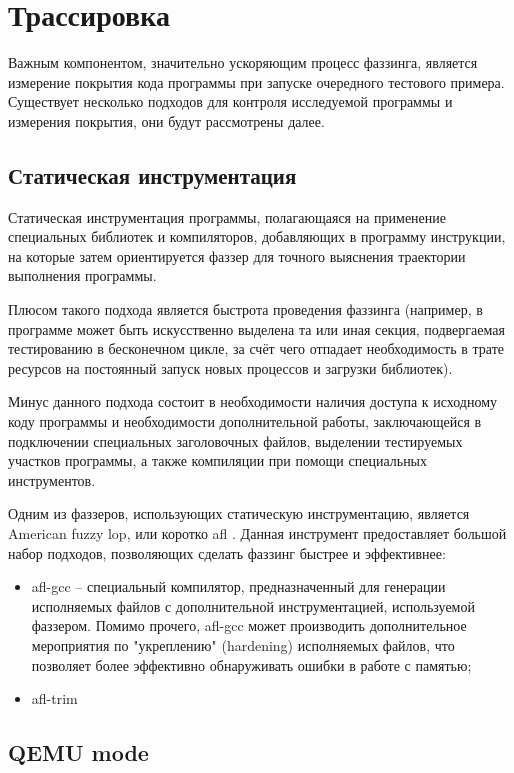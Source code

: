 \section{Трассировка}\label{sec:trace}

Важным компонентом, значительно ускоряющим процесс фаззинга, является измерение покрытия кода программы при запуске очередного тестового примера. Существует несколько подходов для контроля исследуемой программы и измерения покрытия, они будут рассмотрены далее.


\subsection{Статическая инструментация}

Статическая инструментация программы, полагающаяся на применение специальных библиотек и компиляторов, добавляющих в программу инструкции, на которые затем ориентируется фаззер для точного выяснения траектории выполнения программы.

Плюсом такого подхода является быстрота проведения фаззинга (например, в программе может быть искусственно выделена та или иная секция, подвергаемая тестированию в бесконечном цикле, за счёт чего отпадает необходимость в трате ресурсов на постоянный запуск новых процессов и загрузки библиотек).

Минус данного подхода состоит в необходимости наличия доступа к исходному коду программы и необходимости дополнительной работы, заключающейся в подключении специальных заголовочных файлов, выделении тестируемых участков программы, а также компиляции при помощи специальных инструментов.

Одним из фаззеров, использующих статическую инструментацию, является American fuzzy lop, или коротко afl \cite{afl}. Данная инструмент предоставляет большой набор подходов, позволяющих сделать фаззинг быстрее и эффективнее:

\begin{itemize}
	\item afl-gcc -- специальный компилятор, предназначенный для генерации исполняемых файлов с дополнительной инструментацией, используемой фаззером. Помимо прочего, afl-gcc может производить дополнительное мероприятия по "укреплению" (hardening) исполняемых файлов, что позволяет более эффективно обнаруживать ошибки в работе с памятью; 
	\item afl-trim %
\end{itemize}

\subsection{QEMU mode}

